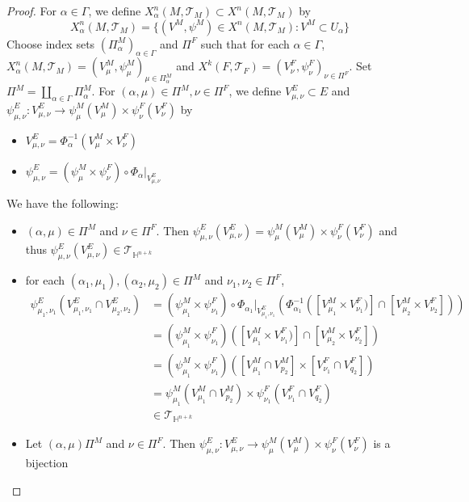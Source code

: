 \documentclass{book}
\theoremstyle{definition}
\newcommand{\al}{\alpha}
\newcommand{\Gam}{\Gamma}
\renewcommand{\H}{\mathbb{H}}
\newcommand{\MT}{\mathcal{T}}
\DeclareMathOperator*{\0}{\mbf{0}}
\DeclareMathOperator*{\1}{\mbf{1}}
\begin{document}
	\begin{proof}
		For $\al \in \Gam$, we define $X^n_{\al}(M, \MT_M) \subset X^n(M, \MT_M)$ by 
		$$X^n_{\al}(M, \MT_M) = \{(V^M, \psi^M) \in X^n(M, \MT_M): V^M \subset U_{\al}\}$$ 
		Choose index sets $(\Pi_{\al}^M)_{\al \in \Gam}$ and $\Pi^F$ such that for each $\al \in \Gam$, $X^n_{\al}(M, \MT_M) = (V^M_{\mu}, \psi^M_\mu)_{\mu \in \Pi^M_{\al}}$ and $X^k(F, \MT_F) = (V^F_{\nu}, \psi^F_{\nu})_{\nu \in \Pi^F}$. Set $\Pi^M = \coprod_{\al \in \Gam} \Pi_{\al}^M$. For $(\al, \mu) \in \Pi^M, \nu \in \Pi^F$, we define $V^E_{\mu, \nu} \subset E$ and $\psi^E_{\mu, \nu}: V^E_{\mu, \nu} \rightarrow \psi^M_{\mu}(V^M_{\mu}) \times \psi^F_{\nu}(V^F_{\nu})$ by 
		\begin{itemize}
			\item $V^E_{\mu, \nu} = \Phi_{\al}^{-1}(V^M_{\mu} \times V^F_{\nu})$ 
			\item $\psi^E_{\mu, \nu} = (\psi^M_{\mu} \times \psi^F_{\nu}) \circ \Phi_{\al}|_{V^E_{\mu, \nu}}$
		\end{itemize}
		We have the following:
		\begin{itemize}
			\item $(\al, \mu) \in \Pi^M$ and $\nu \in \Pi^F$. Then $\psi^E_{\mu, \nu}(V^E_{\mu, \nu}) = \psi^M_{\mu}(V^M_{\mu}) \times \psi^F_{\nu}(V^F_{\nu})$ and thus $\psi^E_{\mu, \nu}(V^E_{\mu, \nu}) \in \MT_{\H^{n + k}}$ 
			\item for each $(\al_1, \mu_1), (\al_2, \mu_2) \in \Pi^M$ and $\nu_1, \nu_2 \in \Pi^F$, 
			\begin{align*}
				\psi^E_{\mu_1, \nu_1}(V^E_{\mu_1, \nu_1} \cap V^E_{\mu_2, \nu_2}) 
				& = (\psi^M_{\mu_1} \times \psi^F_{\nu_1}) \circ \Phi_{\al_1}|_{V^E_{\mu_1, \nu_1}} (\Phi_{\al_1}^{-1}([V^M_{\mu_1} \times V^F_{\nu_1})] \cap [V^M_{\mu_2} \times V^F_{\nu_2}])) \\
				& = (\psi^M_{\mu_1} \times \psi^F_{\nu_1})([V^M_{\mu_1} \times V^F_{\nu_1})] \cap [V^M_{\mu_2} \times V^F_{\nu_2}]) \\
				& = (\psi_{\mu_1}^M \times \psi_{\nu_1}^F)([V^M_{\mu_1} \cap V^M_{p_2}] \times [V^F_{\nu_1} \cap V^F_{q_2}]) \\
				& = \psi_{\mu_1}^M (V^M_{\mu_1} \cap V^M_{p_2}) \times \psi_{\nu_1}^F(V^F_{\nu_1} \cap V^F_{q_2}) \\
				& \in \MT_{\H^{n+k}}
			\end{align*}
			\item Let $(\al, \mu) \Pi^M$ and $\nu \in \Pi^F$. Then $\psi^E_{\mu,\nu}: V^E_{\mu,\nu} \rightarrow \psi^M_{\mu}(V^M_{\mu}) \times \psi^F_{\nu}(V^F_{\nu})$ is a bijection

\end{itemize}
\end{proof}
\end{document}
